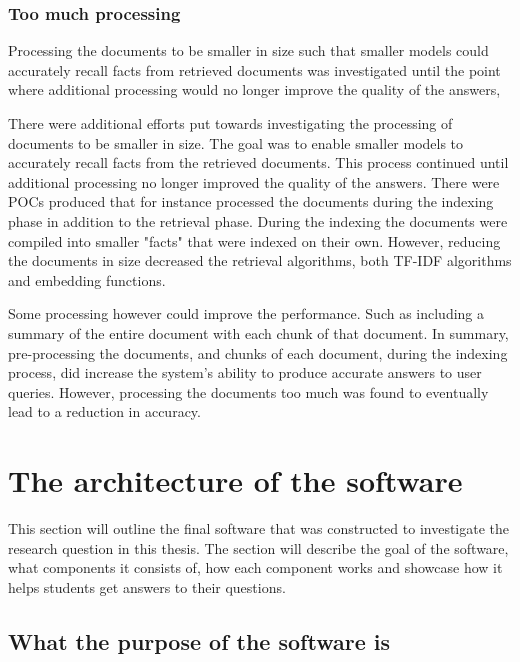 





\subsubsection{Too much processing}


Processing the documents to be smaller in size such that smaller models could accurately recall facts from retrieved documents was investigated until the point where additional processing would no longer improve the quality of the answers,


There were additional efforts put towards investigating the processing of documents to be smaller in size. The goal was to enable smaller models to accurately recall facts from the retrieved documents. This process continued until additional processing no longer improved the quality of the answers. There were \gls{POC}s produced that for instance processed the documents during the indexing phase in addition to the retrieval phase. During the indexing the documents were compiled into smaller "facts" that were indexed on their own. However, reducing the documents in size decreased the retrieval algorithms, both \gls{TF-IDF} algorithms and embedding functions.


Some processing however could improve the performance. Such as including a summary of the entire document with each chunk of that document. In summary, pre-processing the documents, and chunks of each document, during the indexing process, did increase the system’s ability to produce accurate answers to user queries. However, processing the documents too much was found to eventually lead to a reduction in accuracy.


\section{The architecture of the software}


This section will outline the final software that was constructed to investigate the research question in this thesis. The section will describe the goal of the software, what components it consists of, how each component works and showcase how it helps students get answers to their questions.


\subsection{What the purpose of the software is}


